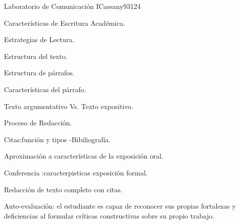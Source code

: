 \begin{syllabus}
\begin{competences}
    \item {}
    \item {}
    \item {}
\end{competences}

\begin{unit}{Laboratorio de Comunicación I}{}{Cassany93}{12}{4}
   \begin{topics}
      \item Características de Escritura Académica.
      \item Estrategias de Lectura.
      \item Estructura del texto.
      \item Estructura de párrafos.
      \item Características del párrafo.
      \item Texto argumentativo Vs. Texto expositivo.
      \item Proceso de Redacción.
      \item Citas:función y tipos -Bibiliografía.
      \item Aproximación a características de la exposición oral.
      \item Conferencia :caracterpisticas exposición formal.
      \item Redacción de texto completo con citas.  
   \end{topics}
   \begin{learningoutcomes}
      \item Auto-evaluación: el estudiante es capaz de reconocer sus propias fortalezas y deficiencias al formular críticas constructivas sobre su propio trabajo.
   \end{learningoutcomes}
\end{unit}



\begin{coursebibliography}
\end{coursebibliography}

\end{syllabus}
